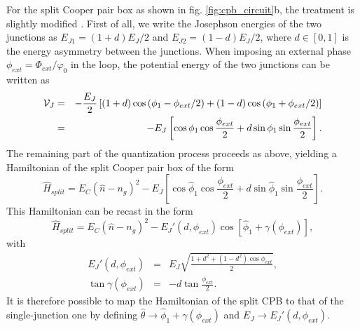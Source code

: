 For the split Cooper pair box as shown in fig. \ref{fig:cpb_circuit}b, the treatment is slightly modified \citep{cottet_implementation_2002}. First of all, we write the Josephson energies of the two junctions as $E_{J1}=(1+d)E_J/2$ and $E_{J2}=(1-d)E_J/2$, where $d\in[0,1]$ is the energy asymmetry between the junctions. When imposing an external phase $\phi_{ext}=\Phi_{ext}/\varphi_0$ in the loop, the potential energy of the two junctions can be written as
%
\begin{eqnarray}
\begin{mathcal}V\end{mathcal}_J & = & -\frac{E_J}{2}\left[(1+d)\cos{(\phi_1-\phi_{ext}/2)}+(1-d)\cos{(\phi_1+\phi_{ext}/2)} \right] \\
& = & -E_J\left[\cos{\phi_1}\cos{\frac{\phi_{ext}}{2}}+d\sin{\phi_1}\sin{\frac{\phi_{ext}}{2}}\right].
\end{eqnarray}
%
The remaining part of the quantization process proceeds as above, yielding a Hamiltonian of the split Cooper pair box of the form
%
\begin{equation}
\hat{H}_{split} = E_C(\hat{n}-n_g)^2-E_J\left[\cos{\hat{\phi}_1}\cos{\frac{\phi_{ext}}{2}}+d\sin{\hat{\phi}_1}\sin{\frac{\phi_{ext}}{2}}\right].
\end{equation}
%
This Hamiltonian can be recast in the form \citep{cottet_implementation_2002}
%
\begin{equation}
\hat{H}_{split} = E_C(\hat{n}-n_g)^2-E_J'(d,\phi_{ext})\cos{[\hat{\phi}_1+\gamma(\phi_{ext})]},
\end{equation}
%
with
%
\begin{eqnarray}
E_J'(d,\phi_{ext}) & = & E_J\sqrt{\frac{1+d^2+(1-d^2)\cos{\phi_{ext}}}{2}}, \\
\tan{\gamma(\phi_{ext})} & = & -d\tan{\frac{\phi_{ext}}{2}}. \label{eq:josephson_energy_modulation}
\end{eqnarray}
%
It is therefore possible to map the Hamiltonian of the split CPB to that of the single-junction one by defining $\hat{\theta}\to\hat{\phi}_1+\gamma(\phi_{ext})$ and $E_J\to E_J'(d,\phi_{ext})$. 

